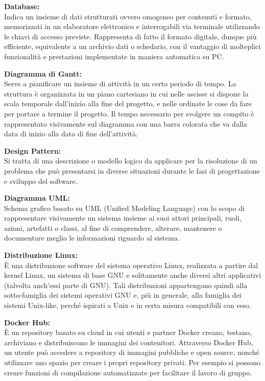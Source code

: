 \documentclass[a4paper, oneside, openany, dvipsnames, table]{article}
\begin{document}
\textbf{Database:}\\	 Indica un insieme di dati strutturati ovvero omogeneo per contenuti e formato, memorizzati in un elaboratore elettronico e interrogabili via terminale utilizzando le chiavi di accesso previste. Rappresenta di fatto il formato digitale, dunque più efficiente, equivalente a un archivio dati o schedario, con il vantaggio di molteplici funzionalità e prestazioni implementate in maniera automatica su PC.

\textbf{Diagramma di Gantt:}\\	Serve a pianificare un insieme di attività in un certo periodo di tempo. La struttura è organizzata in un piano cartesiano in cui nelle ascisse si dispone la scala temporale dall’inizio alla fine del progetto, e nelle ordinate le cose da fare per portare a termine il progetto. Il tempo necessario per svolgere un compito è rappresentato visivamente sul diagramma con una barra colorata che va dalla data di inizio alla data di fine dell’attività.

\textbf{Design Pattern:} \\	Si tratta di una descrizione o modello logico da applicare per la risoluzione di un problema che può presentarsi in diverse situazioni durante le fasi di progettazione e sviluppo del software.

\textbf{Diagramma UML:}\\	Schema grafico basato su UML (Unified Modeling Language) con lo scopo di rappresentare visivamente un sistema insieme ai suoi attori principali, ruoli, azioni, artefatti o classi, al fine di comprendere, alterare, mantenere o documentare meglio le informazioni riguardo al sistema.

\textbf{Distribuzione Linux:}\\	\`E una distribuzione software del sistema operativo Linux, realizzata a partire dal kernel Linux, un sistema di base GNU e solitamente anche diversi altri applicativi (talvolta anch'essi parte di GNU). Tali distribuzioni appartengono quindi alla sotto-famiglia dei sistemi operativi GNU e, più in generale, alla famiglia dei sistemi Unix-like, perché ispirati a Unix e in certa misura compatibili con esso.

\textbf{Docker Hub:}\\	\`E un repository basato su cloud in cui utenti e partner Docker creano, testano, archiviano e distribuiscono le immagini dei contenitori. Attraverso Docker Hub, un utente può accedere a repository di immagini pubbliche e open source, nonché utilizzare uno spazio per creare i propri repository privati. Per esempio si possono creare funzioni di compilazione automatizzate per facilitare il lavoro di gruppo.
\end{document}
